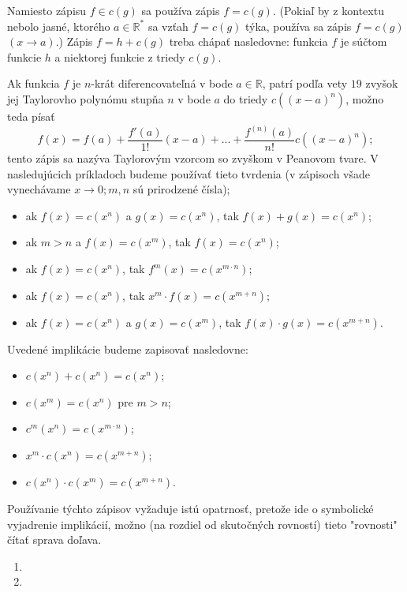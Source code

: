Namiesto zápisu $f\in c(g)$ sa používa zápis $f=c(g)$. (Pokiaľ by z kontextu nebolo jasné, ktorého $a\in\mathbb{R^*}$ sa vzťah $f=c(g)$ týka, používa sa zápis $f=c(g)$ $(x\rightarrow a).$) Zápis $f=h+c(g)$ treba chápať nasledovne: funkcia $f$ je súčtom funkcie $h$ a niektorej funkcie z triedy $c(g)$.

Ak funkcia $f$ je $n$-krát diferencovateľná v bode $a\in\mathbb{R}$, patrí podľa vety $19$ zvyšok jej Taylorovho polynómu stupňa $n$ v bode $a$ do triedy $c((x-a)^n)$, možno teda písať
$$f(x)=f(a)+\frac{f'(a)}{1!}(x-a)+...+\frac{f^{(n)}(a)}{n!}c((x-a)^n);$$
tento zápis sa nazýva Taylorovým vzorcom so zvyškom v Peanovom tvare.
V nasledujúcich príkladoch budeme používať tieto tvrdenia (v zápisoch všade vynechávame $x\rightarrow 0;m,n$ sú prirodzené čísla);
\begin{itemize}
\item ak $f(x)=c(x^n)$ a $g(x)=c(x^n)$, tak $f(x)+g(x)=c(x^n)$;
\item ak $m>n$ a $f(x)=c(x^m)$, tak $f(x)=c(x^n)$;
\item ak $f(x)=c(x^n)$, tak $f^m(x)=c(x^{m\cdot n})$;
\item ak $f(x)=c(x^n)$, tak $x^m\cdot f(x)=c(x^{m+n})$;
\item ak $f(x)=c(x^n)$ a $g(x)=c(x^m)$, tak $f(x)\cdot g(x)=c(x^{m+n})$.
\end{itemize}

Uvedené implikácie budeme zapisovať nasledovne:
\begin{itemize}
\item $c(x^n)+c(x^n)=c(x^n)$;
\item $c(x^m)=c(x^n)$ pre $m>n$;
\item $c^m(x^n)=c(x^{m\cdot n})$;
\item $x^m\cdot c(x^n)=c(x^{m+n})$;
\item $c(x^n)\cdot c(x^m)=c(x^{m+n})$.
\end{itemize}

Používanie týchto zápisov vyžaduje istú opatrnosť, pretože ide o symbolické vyjadrenie implikácií, možno (na rozdiel od skutočných rovností) tieto "rovnosti" čítať sprava doľava.

\begin{enumerate}[resume]
	\item {}
	\item {}
\end{enumerate}

